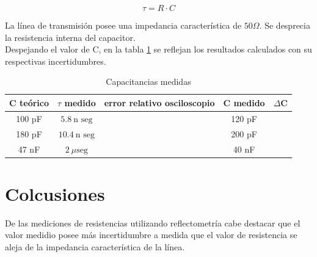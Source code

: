 \documentclass[a4paper,10pt]{article}
\begin{document}
		\begin{equation}
			\tau = R\cdot C
		\end{equation}
	
	\indent La línea de transmisión posee una impedancia característica de 
	$50\Omega$. Se desprecia la resistencia interna del capacitor. \\
	\indent Despejando el valor de C, en la tabla \ref{tab002} se reflejan los 
	resultados calculados con su respectivas incertidumbres. \\

		\begin{table}[!htp]
			\centering
			\begin{tabular}{|c|c|c|c|c|}
				\hline
    			C teórico & $\tau$ medido & error relativo osciloscopio & C 
				medido &
				$\Delta$C \\
				\hline
				100 pF & $5.8~\text{n seg}$ &  & 120 pF & \\
				\hline 
				180 pF & $10.4~\text{n seg}$ & & 200 pF & \\
				\hline
				47 nF & $2~\mu\text{seg}$ & & 40 nF & \\
				\hline
			\end{tabular}
			\caption{Capacitancias medidas} 
			\label{tab002} %
		\end{table}

	\newpage
	\section{Colcusiones}
	\indent De las mediciones de resistencias utilizando reflectometría cabe 
	destacar que el valor medidio posee más incertidumbre a medida que el 
	valor de resistencia se aleja de la impedancia característica de la línea.
\end{document}
